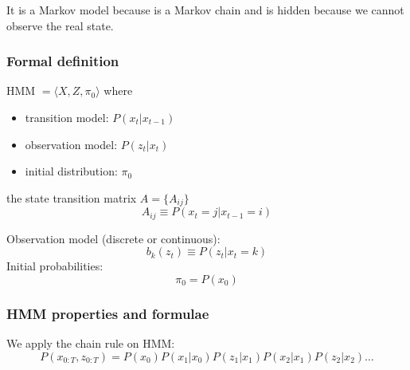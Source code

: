 It is a Markov model because is a Markov chain and is hidden because we cannot observe the real state.

\subsubsection{Formal definition}
HMM $= \langle X, Z, \pi_{0} \rangle$ where
\begin{itemize}
    \item transition model: $P(x_{t}|x_{t-1})$
    \item observation model: $P(z_{t}|x_{t})$
    \item initial distribution: $\pi_{0}$
\end{itemize}

the state transition matrix $A = \{A_{ij}\}$
\begin{equation}
    A_{ij} \equiv P(x_{t} = j | x_{t - 1} = i)
\end{equation}

Observation model (discrete or continuous):
\begin{equation}
    b_{k}(z_{t}) \equiv P(z_{t} | x_{t} = k)
\end{equation}
Initial probabilities:
\begin{equation}
    \pi_{0} = P(x_{0})
\end{equation}

\subsubsection{HMM properties and formulae}

We apply the chain rule on HMM:
\begin{equation}
    P(x_{0:T}, z_{0:T}) = P(x_{0})P(x_{1}|x_{0})P(z_{1}|x_{1})P(x_{2}|x_{1})P(z_{2}|x_{2})\dots
\end{equation}

